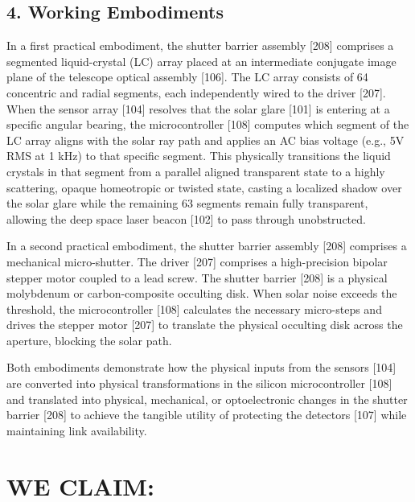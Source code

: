 \documentclass[12pt,a4paper]{article}
\begin{document}
\subsection*{4. Working Embodiments}
In a first practical embodiment, the shutter barrier assembly [208] comprises a segmented liquid-crystal (LC) array placed at an intermediate conjugate image plane of the telescope optical assembly [106]. The LC array consists of 64 concentric and radial segments, each independently wired to the driver [207]. When the sensor array [104] resolves that the solar glare [101] is entering at a specific angular bearing, the microcontroller [108] computes which segment of the LC array aligns with the solar ray path and applies an AC bias voltage (e.g., 5V RMS at 1 kHz) to that specific segment. This physically transitions the liquid crystals in that segment from a parallel aligned transparent state to a highly scattering, opaque homeotropic or twisted state, casting a localized shadow over the solar glare while the remaining 63 segments remain fully transparent, allowing the deep space laser beacon [102] to pass through unobstructed.

In a second practical embodiment, the shutter barrier assembly [208] comprises a mechanical micro-shutter. The driver [207] comprises a high-precision bipolar stepper motor coupled to a lead screw. The shutter barrier [208] is a physical molybdenum or carbon-composite occulting disk. When solar noise exceeds the threshold, the microcontroller [108] calculates the necessary micro-steps and drives the stepper motor [207] to translate the physical occulting disk across the aperture, blocking the solar path.

Both embodiments demonstrate how the physical inputs from the sensors [104] are converted into physical transformations in the silicon microcontroller [108] and translated into physical, mechanical, or optoelectronic changes in the shutter barrier [208] to achieve the tangible utility of protecting the detectors [107] while maintaining link availability.

\newpage

\section*{WE CLAIM:}
\end{document}
